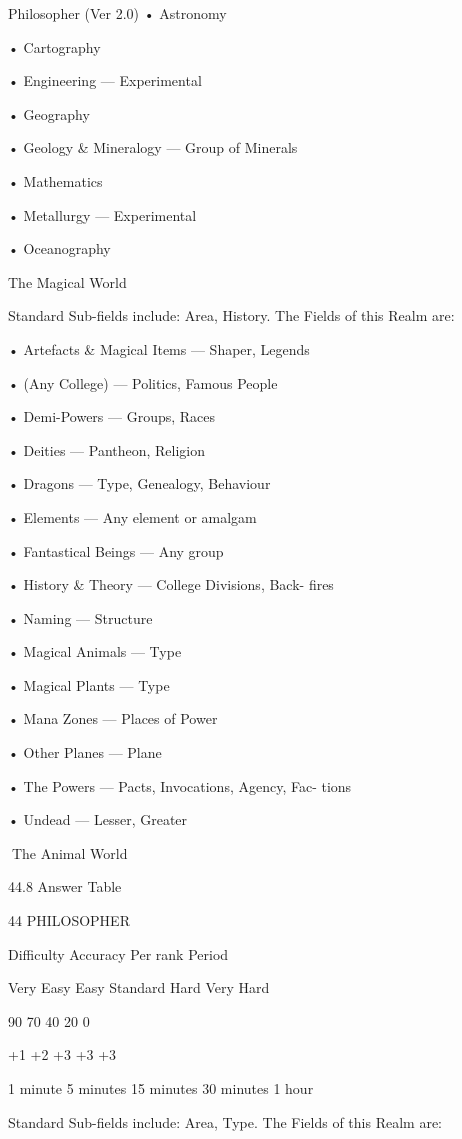 \begin{Chapter}{Philosopher (Ver 2.0)}
• Astronomy  

• Cartography  

• Engineering — Experimental  

• Geography  

• Geology \& Mineralogy — Group of Minerals  

• Mathematics  

• Metallurgy — Experimental  

• Oceanography 

The Magical World 

Standard  Sub-fields  include:  Area,  History.  The 
Fields of this Realm are:  

• Artefacts \& Magical Items — Shaper, Legends  

• (Any College) — Politics, Famous People  

• Demi-Powers — Groups, Races  

• Deities — Pantheon, Religion  

• Dragons — Type, Genealogy, Behaviour  

• Elements — Any element or amalgam  

• Fantastical Beings — Any group  

•  History  \&  Theory  —  College  Divisions,  Back-
fires  

• Naming — Structure  

• Magical Animals — Type  

• Magical Plants — Type  

• Mana Zones — Places of Power  

• Other Planes — Plane  

•  The  Powers —  Pacts,  Invocations, Agency,  Fac-
tions  

• Undead — Lesser, Greater 

The Animal World 

44.8 Answer Table 

44 PHILOSOPHER 

Difficulty   Accuracy   Per rank   Period  

Very Easy 
Easy 
Standard 
Hard 
Very Hard 
 

90%
70%
40%
20%
0%

+1%
+2%
+3%
+3%
 +3%

1 minute  
5 minutes  
15 minutes  
30 minutes  
1 hour 

 

Standard  Sub-fields  include:  Area,  Type.  The 
Fields of this Realm are:  


\end{Chapter}
